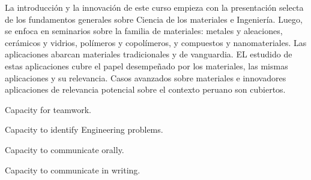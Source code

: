 \begin{syllabus}


\begin{justification}
La introducción y la innovación de este curso empieza con la presentación selecta de los fundamentos generales sobre Ciencia de los materiales e Ingeniería.
Luego, se enfoca en seminarios sobre la familia de materiales: metales y aleaciones, cerámicos y vidrios, polímeros y copolímeros, y compuestos y nanomateriales.
Las aplicaciones abarcan materiales tradicionales y de vanguardia. EL estudido de estas aplicaciones cubre el papel desempeñado por los materiales, 
las mismas aplicaciones y su relevancia. Casos avanzados sobre materiales e innovadores aplicaciones de relevancia potencial sobre el contexto peruano son cubiertos.


\end{justification}

\begin{goals}
\item Capacity for teamwork.
\item Capacity to identify Engineering problems.
\item Capacity to communicate orally.
\item Capacity to communicate in writing.
\end{goals}

% 


\end{syllabus}
